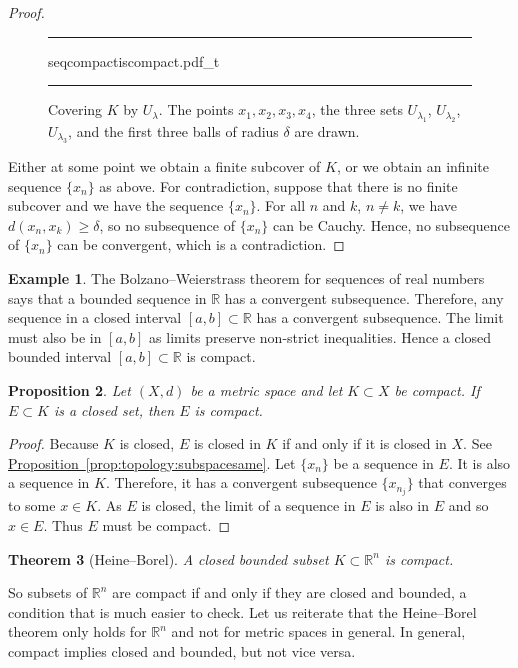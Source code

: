 \documentclass[12pt,openany]{book}
\newcommand{\R}{{\mathbb{R}}}
\theoremstyle{plain}
\newtheorem{thm}{Theorem}[section]
\newtheorem{prop}[thm]{Proposition}
\theoremstyle{remark}
\theoremstyle{definition}
\newenvironment{myfig}{%
\begin{figure}[h!t]
\noindent\rule{\textwidth}{0.5pt}\vspace{12pt}\par\centering}%
{\par\noindent\rule{\textwidth}{0.5pt}
\end{figure}}
\theoremstyle{exercise}
\theoremstyle{example}
\newtheorem{example}[thm]{Example}
\newcommand{\propref}[1]{\hyperref[#1]{Proposition~\ref*{#1}}}
\begin{document}
\begin{proof}
\begin{myfig}
{seqcompactiscompact.pdf_t}
\caption{Covering $K$ by $U_{\lambda}$.  The points
$x_1,x_2,x_3,x_4$, 
the three sets 
$U_{\lambda_1}$,
$U_{\lambda_2}$,
$U_{\lambda_3}$,
and 
the first three balls
of radius $\delta$ are drawn.\label{fig:seqcompactiscompact}}
\end{myfig}

Either at some point we obtain a finite subcover of $K$,
or we obtain an
infinite
sequence $\{ x_n \}$ as above.
For contradiction, suppose that
there is no finite subcover and we have the sequence $\{ x_n \}$.
For all $n$ and $k$, $n \neq k$, 
we have $d(x_n,x_k) \geq \delta$,
so no subsequence of $\{ x_n \}$ can be
Cauchy.  Hence, no subsequence of $\{ x_n \}$ can be convergent,
which is a contradiction.
\end{proof}

\begin{example}
The Bolzano--Weierstrass theorem for sequences of real numbers
says that a bounded sequence in $\R$ has a convergent
subsequence.  Therefore, any sequence in a closed interval $[a,b] \subset \R$ has 
a convergent subsequence.  The limit must also be in $[a,b]$ as limits
preserve non-strict inequalities.  Hence a closed bounded interval $[a,b]
\subset \R$ is compact.
\end{example}

\begin{prop}
Let $(X,d)$ be a metric space and let $K \subset X$ be compact.  If
$E \subset K$ is a closed set, then $E$ is compact.
\end{prop}

\begin{proof}
Because $K$ is closed, $E$ is closed in $K$ if
and only if it is closed in $X$.
See \propref{prop:topology:subspacesame}.
Let $\{ x_n \}$ be a sequence in $E$.  It is also a sequence in $K$.
Therefore, it has a convergent subsequence $\{ x_{n_j} \}$ that converges to
some $x \in K$.  As $E$ is closed, the limit of a sequence in $E$ is also in $E$
and so $x \in E$.  Thus $E$ must be compact.
\end{proof}

\begin{thm}[Heine--Borel] 
\label{thm:msbw}
A closed bounded subset $K \subset \R^n$ is compact.
\end{thm}

So subsets of $\R^n$ are compact if and only if they are closed and bounded,
a condition that is much easier to check.
Let us reiterate that the Heine--Borel theorem only holds for $\R^n$ and not
for metric spaces in general.  In general, compact implies closed and
bounded, but not vice versa.
\end{document}
